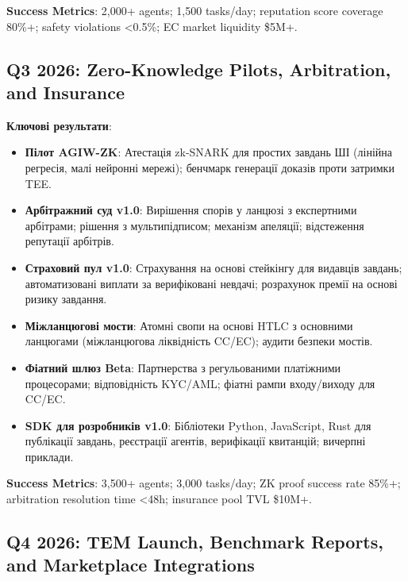 \documentclass[11pt]{article}
\begin{document}
\textbf{Success Metrics}: 2,000+ agents; 1,500 tasks/day; reputation score coverage 80\%+; safety violations <0.5\%; EC market liquidity \$5M+.

\subsection{Q3 2026: Zero-Knowledge Pilots, Arbitration, and Insurance}

\textbf{Ключові результати}:
\begin{itemize}[noitemsep]
  \item \textbf{Пілот AGIW-ZK}: Атестація zk-SNARK для простих завдань ШІ (лінійна регресія, малі нейронні мережі); бенчмарк генерації доказів проти затримки TEE.
  \item \textbf{Арбітражний суд v1.0}: Вирішення спорів у ланцюзі з експертними арбітрами; рішення з мультипідписом; механізм апеляції; відстеження репутації арбітрів.
  \item \textbf{Страховий пул v1.0}: Страхування на основі стейкінгу для видавців завдань; автоматизовані виплати за верифіковані невдачі; розрахунок премії на основі ризику завдання.
  \item \textbf{Міжланцюгові мости}: Атомні свопи на основі HTLC з основними ланцюгами (міжланцюгова ліквідність CC/EC); аудити безпеки мостів.
  \item \textbf{Фіатний шлюз Beta}: Партнерства з регульованими платіжними процесорами; відповідність KYC/AML; фіатні рампи входу/виходу для CC/EC.
  \item \textbf{SDK для розробників v1.0}: Бібліотеки Python, JavaScript, Rust для публікації завдань, реєстрації агентів, верифікації квитанцій; вичерпні приклади.
\end{itemize}

\textbf{Success Metrics}: 3,500+ agents; 3,000 tasks/day; ZK proof success rate 85\%+; arbitration resolution time <48h; insurance pool TVL \$10M+.

\subsection{Q4 2026: TEM Launch, Benchmark Reports, and Marketplace Integrations}
\end{document}
